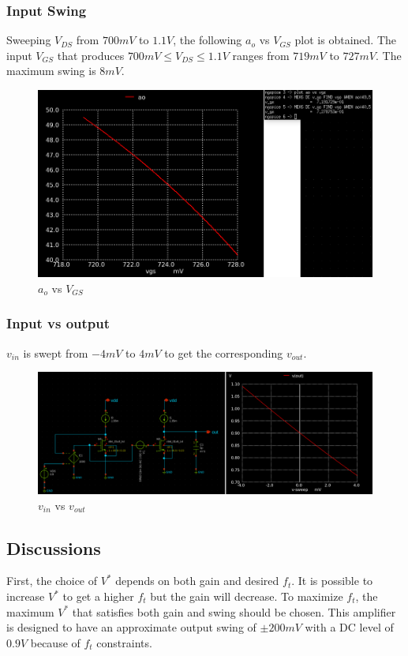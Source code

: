 \documentclass[conference]{IEEEtran}
\begin{document}
\subsubsection{Input Swing}
Sweeping $V_{DS}$ from $700mV$ to $1.1V$, the following $a_o$ vs $V_{GS}$ plot is obtained. 
The input $V_{GS}$ that produces $700mV \leq V_{DS} \leq 1.1V$ ranges from $719mV$ to $727mV$. 
The maximum swing is $8mV$. 
\begin{figure}[H]
	\centering 
	\includegraphics[width=\columnwidth]{gain-fumax-vgs.png}
	\caption{$a_o$ vs $V_{GS}$}
	\label{ao-fumax-vgs}	
\end{figure}
\subsubsection{Input vs output}
$v_{in}$ is swept from $-4mV$ to $4mV$ to get the corresponding $v_{out}$. 
\begin{figure}[H]
	\centering 
	\includegraphics[width=\columnwidth]{vinvout.png}
	\caption{$v_{in}$ vs $v_{out}$}
	\label{vinvout-2}	
\end{figure}

\subsection{Discussions}
First, the choice of $V^*$ depends on both gain and desired $f_t$. It is possible to increase $V^*$ to get a higher $f_t$ but the gain will decrease. To maximize $f_t$, the maximum $V^*$ that satisfies both gain and swing should be chosen. This amplifier is designed to have an approximate output swing of $\pm 200mV$ with a DC level of $0.9V$ because of $f_t$ constraints. 
\end{document}
